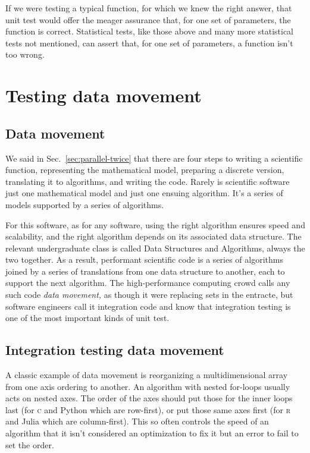 \documentclass[fleqn,10pt]{olplainarticle}
\newcommand{\rlang}{\textsc{r}\xspace}
\begin{document}
If we were testing a typical function, for which we knew the
right answer, that unit test would offer the meager assurance that,
for one set of parameters, the function is correct.
Statistical tests, like those above and many more statistical
tests not mentioned, can assert that, for one set of parameters,
a function isn't too wrong.





\section{Testing data movement}\label{sec:data-movement}

\subsection{Data movement}\label{sec:movement-movement}

We said in Sec.~\ref{sec:parallel-twice} that there are four
steps to writing a scientific function, representing the mathematical model,
preparing a discrete version, translating it to algorithms,
and writing the code.
Rarely is scientific software just one mathematical model
and just one ensuing algorithm. It's a series of models supported
by a series of algorithms.

For this software, as for any software, using the right algorithm
ensures speed and scalability, and the right algorithm depends on
its associated data structure. The relevant undergraduate class
is called Data Structures and Algorithms, always the two together.
As a result, performant scientific code is a series of algorithms
joined by a series of translations from one data structure to
another, each to support the next algorithm. The high-performance
computing crowd calls any such code \emph{data movement,} as though
it were replacing sets in the entracte,
but software engineers call it integration code and know that
integration testing is one of the most important kinds of unit test.


\subsection{Integration testing data movement}

A classic example of data movement is reorganizing a multidimensional
array from one axis ordering to another. An algorithm with nested
for-loops usually acts on nested axes. The order of the axes should
put those for the inner loops last (for \textsc{c} and Python which are row-first), or put those
same axes first (for \rlang and Julia which are column-first). This so
often controls the speed of an algorithm that it isn't considered an 
optimization to fix it but an error to fail to set the order.
\end{document}
